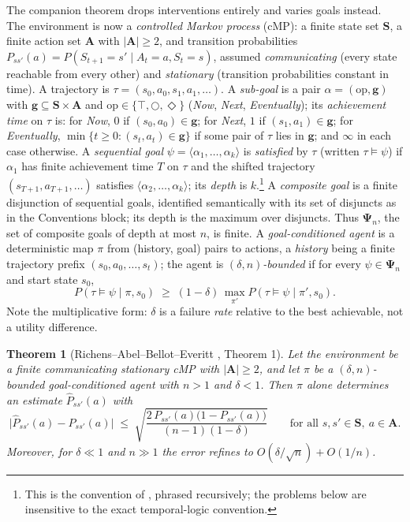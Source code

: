 \documentclass[11pt]{amsart}
\theoremstyle{plain}
\newtheorem{theorem}{Theorem}[section]
\theoremstyle{definition}
\newcommand{\bS}{\mathbf{S}}
\newcommand{\bA}{\mathbf{A}}
\newcommand{\bg}{\mathbf{g}}
\newcommand{\bPsi}{\boldsymbol{\Psi}}
\begin{document}
The companion theorem drops interventions entirely and varies goals instead. The environment is now a \emph{controlled Markov process} (cMP): a finite state set $\bS$, a finite action set $\bA$ with $|\bA|\ge2$, and transition probabilities $P_{ss'}(a)=P(S_{t+1}\!=\!s'\mid A_t\!=\!a,S_t\!=\!s)$, assumed \emph{communicating} (every state reachable from every other) and \emph{stationary} (transition probabilities constant in time). A trajectory is $\tau=(s_0,a_0,s_1,a_1,\dots)$. A \emph{sub-goal} is a pair $\alpha=(\mathrm{op},\bg)$ with $\bg\subseteq\bS\times\bA$ and $\mathrm{op}\in\{\top,\bigcirc,\Diamond\}$ (\emph{Now}, \emph{Next}, \emph{Eventually}); its \emph{achievement time} on $\tau$ is: for \emph{Now}, $0$ if $(s_0,a_0)\in\bg$; for \emph{Next}, $1$ if $(s_1,a_1)\in\bg$; for \emph{Eventually}, $\min\{t\ge0:(s_t,a_t)\in\bg\}$ if some pair of $\tau$ lies in $\bg$; and $\infty$ in each case otherwise. A \emph{sequential goal} $\psi=\langle\alpha_1,\dots,\alpha_k\rangle$ is \emph{satisfied} by $\tau$ (written $\tau\models\psi$) if $\alpha_1$ has finite achievement time $T$ on $\tau$ and the shifted trajectory $(s_{T+1},a_{T+1},\dots)$ satisfies $\langle\alpha_2,\dots,\alpha_k\rangle$; its \emph{depth} is $k$.\footnote{This is the convention of \cite[Def.~5--6]{richens2025}, phrased recursively; the problems below are insensitive to the exact temporal-logic convention.} A \emph{composite goal} is a finite disjunction of sequential goals, identified semantically with its set of disjuncts as in the Conventions block; its depth is the maximum over disjuncts. Thus $\bPsi_n$, the set of composite goals of depth at most $n$, is finite. A \emph{goal-conditioned agent} is a deterministic map $\pi$ from (history, goal) pairs to actions, a \emph{history} being a finite trajectory prefix $(s_0,a_0,\dots,s_t)$; the agent is \emph{$(\delta,n)$-bounded} if for every $\psi\in\bPsi_n$ and start state $s_0$,
\[
   P(\tau\models\psi\mid \pi,s_0)\;\ge\;(1-\delta)\,\max_{\pi'}P(\tau\models\psi\mid \pi',s_0).
\]
Note the multiplicative form: $\delta$ is a failure \emph{rate} relative to the best achievable, not a utility difference.

\begin{theorem}[Richens--Abel--Bellot--Everitt \cite{richens2025}, Theorem 1]\label{thm:rabe}
Let the environment be a finite communicating stationary cMP with $|\bA|\ge2$, and let $\pi$ be a $(\delta,n)$-bounded goal-conditioned agent with $n>1$ and $\delta<1$. Then $\pi$ alone determines an estimate $\widehat P_{ss'}(a)$ with
\[
   \bigl|\widehat P_{ss'}(a)-P_{ss'}(a)\bigr|\;\le\;\sqrt{\frac{2\,P_{ss'}(a)\bigl(1-P_{ss'}(a)\bigr)}{(n-1)(1-\delta)}}
   \qquad\text{for all } s,s'\in\bS,\ a\in\bA.
\]
Moreover, for $\delta\ll1$ and $n\gg1$ the error refines to $O(\delta/\sqrt{n})+O(1/n)$.
\end{theorem}
\end{document}
